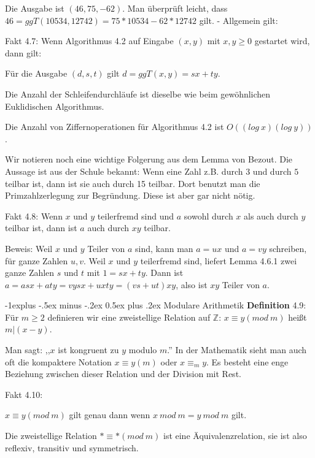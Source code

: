 \documentclass[a4paper]{article}
\makeatletter
\renewcommand{\subsection}{\@startsection{subsection}{2}{0mm}%
 {-1explus -.5ex minus -.2ex}%
 {0.5ex plus .2ex}%
 {\normalfont\normalsize\bfseries}}
\makeatother
\begin{document}
\begin{multicols}{3}
    Die Ausgabe ist $(46, 75 ,-62)$. Man überprüft leicht, dass $46 = ggT(10534,12742) = 75* 10534 - 62 * 12742$ gilt. - Allgemein gilt:

    Fakt 4.7: Wenn Algorithmus 4.2 auf Eingabe $(x,y)$ mit $x,y\geq 0$ gestartet wird, dann gilt:
    \begin{enumerate*}
        \item Für die Ausgabe $(d,s,t)$ gilt $d= ggT(x,y) =sx+ty$.
        \item Die Anzahl der Schleifendurchläufe ist dieselbe wie beim gewöhnlichen Euklidischen Algorithmus.
        \item Die Anzahl von Ziffernoperationen für Algorithmus 4.2 ist $O((log\ x)(log\ y))$.
    \end{enumerate*}

    Wir notieren noch eine wichtige Folgerung aus dem Lemma von Bezout. Die Aussage ist aus der Schule bekannt: Wenn eine Zahl z.B. durch $3$ und durch $5$ teilbar ist, dann ist sie auch durch 15 teilbar. Dort benutzt man die Primzahlzerlegung zur Begründung. Diese ist aber gar nicht nötig.

    Fakt 4.8: Wenn $x$ und $y$ teilerfremd sind und $a$ sowohl durch $x$ als auch durch $y$ teilbar ist, dann ist $a$ auch durch $xy$ teilbar.

    Beweis: Weil $x$ und $y$ Teiler von $a$ sind, kann man $a=ux$ und $a=vy$ schreiben, für ganze Zahlen $u,v$. Weil $x$ und $y$ teilerfremd sind, liefert Lemma 4.6.1 zwei ganze Zahlen $s$ und $t$ mit $1=sx+ty$. Dann ist $a=asx+aty=vysx+uxty= (vs+ut)xy$, also ist $xy$ Teiler von $a$.

    \subsection{Modulare Arithmetik}
    \textbf{Definition} 4.9: Für $m\geq 2$ definieren wir eine zweistellige Relation auf $\mathbb{Z}$: $x\equiv y (mod\ m)$ heißt $m|(x-y)$.

    Man sagt: ,,$x$ ist kongruent zu $y$ modulo $m$.'' In der Mathematik sieht man auch oft die kompaktere Notation $x\equiv y(m)$ oder $x\equiv_m y$. Es besteht eine enge Beziehung zwischen dieser Relation und der Division mit Rest.

    Fakt 4.10:
    \begin{enumerate*}
        \item $x\equiv y(mod\ m)$ gilt genau dann wenn $x\ mod\ m=y\ mod\ m$ gilt.
        \item Die zweistellige Relation $*\equiv *(mod\ m)$ ist eine Äquivalenzrelation, sie ist also reflexiv, transitiv und symmetrisch.
    \end{enumerate*}


\end{multicols}
\end{document}
